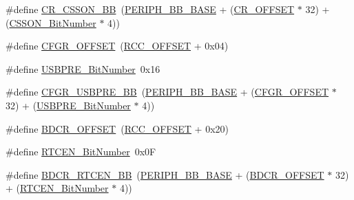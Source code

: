 \begin{DoxyCompactItemize}
\item 
\#define \hyperlink{group___r_c_c___private___defines_gaca914aed10477ae4090fea0a9639b1ea}{C\+R\+\_\+\+C\+S\+S\+O\+N\+\_\+\+BB}~(\hyperlink{openmotestm_2library_2inc_2stm32f10x__map_8h_aed7efc100877000845c236ccdc9e144a}{P\+E\+R\+I\+P\+H\+\_\+\+B\+B\+\_\+\+B\+A\+SE} + (\hyperlink{openmotestm_2library_2src_2stm32f10x__rcc_8c_afa1d3d0ea72132df651c76fc1bdffffc}{C\+R\+\_\+\+O\+F\+F\+S\+ET} $\ast$ 32) + (\hyperlink{openmotestm_2library_2src_2stm32f10x__rcc_8c_a253fa44d87aabc55f0cd6628e77a51fd}{C\+S\+S\+O\+N\+\_\+\+Bit\+Number} $\ast$ 4))
\item 
\#define \hyperlink{group___r_c_c___private___defines_ga8682298330c3b9bae1992e4f1a0af985}{C\+F\+G\+R\+\_\+\+O\+F\+F\+S\+ET}~(\hyperlink{openmotestm_2library_2src_2stm32f10x__rcc_8c_a539e07c3b3c55f1f1d47231341fb11e1}{R\+C\+C\+\_\+\+O\+F\+F\+S\+ET} + 0x04)
\item 
\#define \hyperlink{group___r_c_c___private___defines_gad758d602b6d2b93a04cb8ada87c20c82}{U\+S\+B\+P\+R\+E\+\_\+\+Bit\+Number}~0x16
\item 
\#define \hyperlink{group___r_c_c___private___defines_gabde4e60349b8412a79611c0aeb27c3a2}{C\+F\+G\+R\+\_\+\+U\+S\+B\+P\+R\+E\+\_\+\+BB}~(\hyperlink{openmotestm_2library_2inc_2stm32f10x__map_8h_aed7efc100877000845c236ccdc9e144a}{P\+E\+R\+I\+P\+H\+\_\+\+B\+B\+\_\+\+B\+A\+SE} + (\hyperlink{openmotestm_2library_2src_2stm32f10x__rcc_8c_a8682298330c3b9bae1992e4f1a0af985}{C\+F\+G\+R\+\_\+\+O\+F\+F\+S\+ET} $\ast$ 32) + (\hyperlink{openmotestm_2library_2src_2stm32f10x__rcc_8c_ad758d602b6d2b93a04cb8ada87c20c82}{U\+S\+B\+P\+R\+E\+\_\+\+Bit\+Number} $\ast$ 4))
\item 
\#define \hyperlink{group___r_c_c___private___defines_ga5f8a0c3cb5f5c835bf7eef09515138ad}{B\+D\+C\+R\+\_\+\+O\+F\+F\+S\+ET}~(\hyperlink{openmotestm_2library_2src_2stm32f10x__rcc_8c_a539e07c3b3c55f1f1d47231341fb11e1}{R\+C\+C\+\_\+\+O\+F\+F\+S\+ET} + 0x20)
\item 
\#define \hyperlink{group___r_c_c___private___defines_ga9302c551752124766afc4cee65436405}{R\+T\+C\+E\+N\+\_\+\+Bit\+Number}~0x0F
\item 
\#define \hyperlink{group___r_c_c___private___defines_gaf70aaf70b0752ccb3a60307b2fb46038}{B\+D\+C\+R\+\_\+\+R\+T\+C\+E\+N\+\_\+\+BB}~(\hyperlink{openmotestm_2library_2inc_2stm32f10x__map_8h_aed7efc100877000845c236ccdc9e144a}{P\+E\+R\+I\+P\+H\+\_\+\+B\+B\+\_\+\+B\+A\+SE} + (\hyperlink{openmotestm_2library_2src_2stm32f10x__rcc_8c_a5f8a0c3cb5f5c835bf7eef09515138ad}{B\+D\+C\+R\+\_\+\+O\+F\+F\+S\+ET} $\ast$ 32) + (\hyperlink{openmotestm_2library_2src_2stm32f10x__rcc_8c_a9302c551752124766afc4cee65436405}{R\+T\+C\+E\+N\+\_\+\+Bit\+Number} $\ast$ 4))

\end{DoxyCompactItemize}
